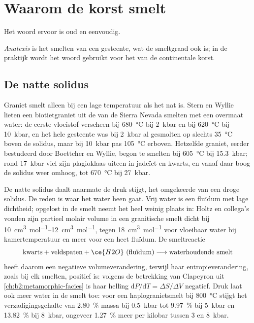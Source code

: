 \section{Waarom de korst smelt}\label{sec:b2:crustal-melting:why}

Het woord ervoor is oud en eenvoudig.

\begin{definition}[Anatexis]\label{def:b2:crustal-melting:anatexis}
\emph{Anatexis} is het smelten van een gesteente, wat de smeltgraad ook is;
in de praktijk wordt het woord gebruikt voor het  van de continentale korst.
\end{definition}

\subsection*{De natte solidus}

Graniet smelt alleen bij een lage temperatuur als het nat is. Stern en Wyllie lieten een
biotietgraniet uit de  van de Sierra Nevada smelten met een overmaat water: de eerste vloeistof verscheen bij
\qty{680}{\celsius} bij \qty{2}{kbar} en bij \qty{620}{\celsius} bij \qty{10}{kbar}, en het
hele gesteente was bij \qty{2}{kbar} al gesmolten op slechts \qty{35}{\celsius} boven de solidus, maar
bij \qty{10}{kbar} pas \qty{105}{\celsius} erboven. Hetzelfde graniet, eerder bestudeerd door
Boettcher en Wyllie, begon te smelten bij \qty{605}{\celsius} bij \qty{15.3}{kbar}; rond
\qty{17}{kbar} viel zijn plagioklaas uiteen in jadeïet en kwarts, en vanaf daar boog de solidus
weer omhoog, tot \qty{670}{\celsius} bij \qty{27}{kbar}.

De natte solidus daalt naarmate de druk stijgt, het omgekeerde van een droge solidus. De reden is waar
het water heen gaat. Vrij water is een fluïdum met lage dichtheid; opgelost in de smelt neemt het heel
weinig plaats in: Holtz en collega's vonden zijn partieel molair volume in een granitische smelt dicht
bij \qtyrange{10}{12}{\cubic\centi\metre\per\mole}, tegen \qty{18}{\cubic\centi\metre\per\mole}
voor vloeibaar water bij kamertemperatuur en meer voor een heet fluïdum. De smeltreactie
\[\text{kwarts} + \text{veldspaten} + \ce{H2O}\ (\text{fluïdum}) \longrightarrow
\text{waterhoudende smelt}\]
heeft daarom een negatieve volumeverandering, terwijl haar entropieverandering, zoals bij elk smelten,
positief is: volgens de betrekking van Clapeyron uit \cref{ch:b2:metamorphic-facies} is haar helling
$\mathrm{d}P/\mathrm{d}T = \Delta S/\Delta V$ negatief. Druk laat ook meer water
in de smelt toe: voor een haplogranietsmelt bij \qty{800}{\celsius} stijgt het verzadigingsgehalte
van \qty{2.80}{\percent} massa bij \qty{0.5}{kbar} tot \qty{9.97}{\percent} bij
\qty{5}{kbar} en \qty{13.82}{\percent} bij \qty{8}{kbar}, ongeveer \qty{1.27}{\percent} meer
per kilobar tussen 3 en \qty{8}{kbar}.

